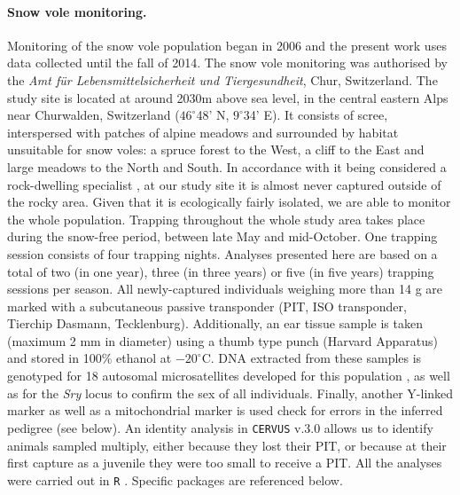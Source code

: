 \paragraph{Snow vole monitoring.}
Monitoring of the snow vole population began in 2006 and the present work uses data collected until the fall of 2014. The snow vole monitoring was authorised by the \textit{Amt f\"{u}r Lebensmittelsicherheit und Tiergesundheit}, Chur, Switzerland. The study site is located at around 2030m above sea level, in the central eastern Alps near Churwalden, Switzerland ($46^{\circ}$48' N, $9^{\circ}$34' E). It consists of scree, interspersed with patches of alpine meadows and surrounded by habitat unsuitable for snow voles: a spruce forest to the West, a cliff to the East and large meadows to the North and South. In accordance with it being considered a rock-dwelling specialist \parencite{Janeau1997}, at our study site it is almost never captured outside of the rocky area. Given that it is ecologically fairly isolated, we are able to monitor the whole population.
Trapping throughout the whole study area takes place during the snow-free period, between late May and mid-October. One trapping session consists of four trapping nights. Analyses presented here are based on a total of two (in one year), three (in three years) or five (in five years) trapping sessions per season.
All newly-captured individuals weighing more than 14 g are marked with a subcutaneous passive transponder (PIT, ISO transponder, Tierchip Dasmann, Tecklenburg). Additionally, an ear tissue sample is taken (maximum 2 mm in diameter) using a thumb type punch (Harvard Apparatus) and stored in 100\% ethanol at $-20^{\circ}\mathrm{C}$. DNA extracted from these samples is genotyped for 18 autosomal microsatellites developed for this population \parencite{Wandeler2008}, as well as for the \textit{Sry} locus to confirm the sex of all individuals. Finally, another Y-linked marker as well as a mitochondrial marker is used check for errors in the inferred pedigree (see below). An identity analysis in \verb+CERVUS+ v.3.0 \parencite{Marshall1998} allows us to identify animals sampled multiply, either because they lost their PIT, or because at their first capture as a juvenile they were too small to receive a PIT.
All the analyses were carried out in \verb+R+ \parencite{R2014}. Specific packages are referenced below.

